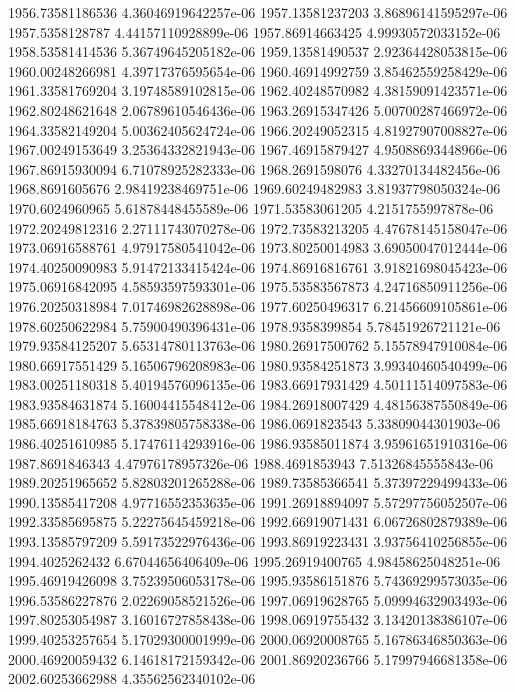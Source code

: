 {1956.73581186536 4.36046919642257e-06
1957.13581237203 3.86896141595297e-06
1957.5358128787 4.44157110928899e-06
1957.86914663425 4.99930572033152e-06
1958.53581414536 5.36749645205182e-06
1959.13581490537 2.92364428053815e-06
1960.00248266981 4.39717376595654e-06
1960.46914992759 3.85462559258429e-06
1961.33581769204 3.19748589102815e-06
1962.40248570982 4.38159091423571e-06
1962.80248621648 2.06789610546436e-06
1963.26915347426 5.00700287466972e-06
1964.33582149204 5.00362405624724e-06
1966.20249052315 4.81927907008827e-06
1967.00249153649 3.25364332821943e-06
1967.46915879427 4.95088693448966e-06
1967.86915930094 6.71078925282333e-06
1968.2691598076 4.33270134482456e-06
1968.8691605676 2.98419238469751e-06
1969.60249482983 3.81937798050324e-06
1970.6024960965 5.61878448455589e-06
1971.53583061205 4.2151755997878e-06
1972.20249812316 2.27111743070278e-06
1972.73583213205 4.47678145158047e-06
1973.06916588761 4.97917580541042e-06
1973.80250014983 3.69050047012444e-06
1974.40250090983 5.91472133415424e-06
1974.86916816761 3.91821698045423e-06
1975.06916842095 4.58593597593301e-06
1975.53583567873 4.24716850911256e-06
1976.20250318984 7.01746982628898e-06
1977.60250496317 6.21456609105861e-06
1978.60250622984 5.75900490396431e-06
1978.9358399854 5.78451926721121e-06
1979.93584125207 5.65314780113763e-06
1980.26917500762 5.15578947910084e-06
1980.66917551429 5.16506796208983e-06
1980.93584251873 3.99340460540499e-06
1983.00251180318 5.40194576096135e-06
1983.66917931429 4.50111514097583e-06
1983.93584631874 5.16004415548412e-06
1984.26918007429 4.48156387550849e-06
1985.66918184763 5.37839805758338e-06
1986.0691823543 5.33809044301903e-06
1986.40251610985 5.17476114293916e-06
1986.93585011874 3.95961651910316e-06
1987.8691846343 4.47976178957326e-06
1988.4691853943 7.51326845555843e-06
1989.20251965652 5.82803201265288e-06
1989.73585366541 5.37397229499433e-06
1990.13585417208 4.97716552353635e-06
1991.26918894097 5.57297756052507e-06
1992.33585695875 5.22275645459218e-06
1992.66919071431 6.06726802879389e-06
1993.13585797209 5.59173522976436e-06
1993.86919223431 3.93756410256855e-06
1994.4025262432 6.67044656406409e-06
1995.26919400765 4.98458625048251e-06
1995.46919426098 3.75239506053178e-06
1995.93586151876 5.74369299573035e-06
1996.53586227876 2.02269058521526e-06
1997.06919628765 5.09994632903493e-06
1997.80253054987 3.16016727858438e-06
1998.06919755432 3.13420138386107e-06
1999.40253257654 5.17029300001999e-06
2000.06920008765 5.16786346850363e-06
2000.46920059432 6.14618172159342e-06
2001.86920236766 5.17997946681358e-06
2002.60253662988 4.35562562340102e-06
}
